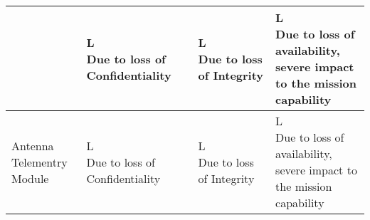 \documentclass{article}
\begin{document}
\begin{center}
\begin{tabular}{|p{3cm}|p{3.5cm}|p{3.5cm}|p{3.5cm}|}
	\makecell{Volatage Regulators} & 
    \makecell[l]{L
    \\ \scriptsize Due to loss of Confidentiality} & 
    \makecell[l]{L
    \\ \scriptsize Due to loss of Integrity }& 
    \makecell[l]{L
    \\ \scriptsize Due to loss of availability,\\
    \scriptsize severe impact to the mission 
    \\\scriptsize capability} \\ \hline

	\makecell{Antenna \\ Telementry Module} & 
    \makecell[l]{L
    \\ \scriptsize Due to loss of Confidentiality} & 
    \makecell[l]{L
    \\ \scriptsize Due to loss of Integrity }& 
    \makecell[l]{L
    \\ \scriptsize Due to loss of availability,\\
    \scriptsize severe impact to the mission 
    \\\scriptsize capability} \\ \hline	

    
	\end{tabular}
\end{center}
\end{document}
